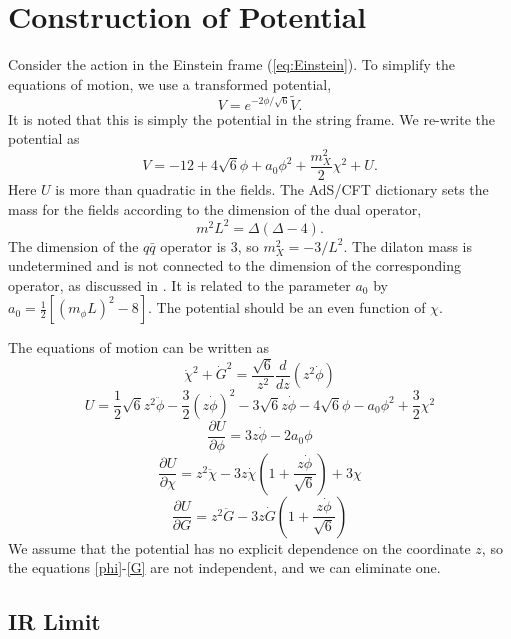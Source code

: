 \documentclass[aps,prd,12pt,nofootinbib]{revtex4}
\newcommand{\be}{\begin{equation}}
\newcommand{\ee}{\end{equation}}
\def\thalf{{\textstyle{\frac{1}{2}}}}
\def\tthalf{{\textstyle{\frac{3}{2}}}}
\def\Dz{\frac{d}{dz}}
\def\phidot{\dot{\phi}}
\def\phiddot{\ddot{\phi}}
\def\chidot{\dot{\chi}}
\def\chiddot{\ddot{\chi}}
\def\Gdot{\dot{G}}
\def\Gddot{\ddot{G}}
\def\rt6{\sqrt{6}}
\def\mL2{(m_{\phi}L)^2}
\begin{document}
\section{Construction of Potential}

Consider the action in the Einstein frame (\ref{eq:Einstein}).
To simplify the equations of motion, we use a transformed potential, 
\be
V=e^{-2\phi/\rt6}\tilde{V}.
\label{transform}
\ee
It is noted that this is simply the potential in the string frame.
We re-write the potential as
\be
V = -12 + 4\sqrt{6}\phi + a_0\phi^2 +\frac{m_X^2}{2}\chi^2 + U.
\label{V}
\ee
Here $U$ is more than quadratic in the fields. 
 The AdS/CFT dictionary sets the mass for the fields according to the dimension of the dual operator,
\be
m^2L^2=\Delta(\Delta-4).
\ee
The dimension of the $q\bar{q}$ operator is 3, so $m_X^2 = -3/L^2$.
The dilaton mass is undetermined and is not connected to the dimension of the corresponding operator, as discussed in \cite{Springer2010}.  
It is related to the parameter $a_0$ by $a_0 = \thalf \left[ \mL2-8 \right]$. 
The potential should be an even function of $\chi$. 

The equations of motion can be written as
\be
\chidot^2 + \Gdot^2 = \frac{\rt6}{z^2} \Dz(z^2\phidot)
\label{C}
\ee
\be
U=\thalf \rt6 z^2 \phiddot - \tthalf (z\phidot)^2 - 3 \rt6 z\phidot 
-4\sqrt{6}\phi - a_0\phi^2 +\tthalf\chi^2
\label{U}
\ee
\be
 \frac{\partial U}{\partial \phi}=3z\phidot - 2a_0\phi
\label{phi}
\ee
\be
 \frac{\partial U}{\partial \chi}
=z^2\chiddot -3z\chidot \left(1+\frac{z\phidot}{\rt6} \right) + 3\chi
\label{chi}
\ee
\be
 \frac{\partial U}{\partial G}=
z^2\Gddot -3z\Gdot \left(1+\frac{z\phidot}{\rt6} \right)
\label{G}
\ee
We assume that the potential has no explicit dependence on the coordinate $z$,  so the equations \ref{phi}-\ref{G} are not independent, and we can eliminate one. 

\subsection{IR Limit}
\end{document}
